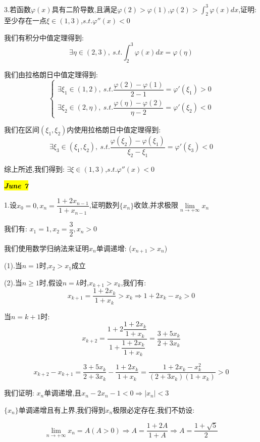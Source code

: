 3.若函数$\varphi(x)$具有二阶导数,且满足$\varphi(2)>\varphi(1)$,$\varphi(2)>\int_{2}^{3}\varphi(x)dx$,证明: 至少存在一点$\xi\in(1,3)$,$s.t.\varphi ''(x)<0$
\begin{solution}
	
	我们有积分中值定理得到: 
	$$\exists \eta\in(2,3),\ s.t. \int_{2}^{3}\varphi(x)dx=\varphi(\eta)$$
	
	我们由拉格朗日中值定理得到: 
	$$\left\lbrace 
	\begin{array}{l}
		\exists \xi_{1}\in(1,2),\ s.t. \dfrac{\varphi(2)-\varphi(1)}{2-1}=\varphi '(\xi_{1})>0\\
		\exists \xi_{2}\in(2,\eta),\ s.t. \dfrac{\varphi(\eta)-\varphi(2)}{\eta-2}=\varphi '(\xi_{2})<0
	\end{array}
	\right. $$
	
	我们在区间$(\xi_{1},\xi_{2})$内使用拉格朗日中值定理得到: 
	$$\exists \xi_{3}\in(\xi_{1},\xi_{2}),\ s.t. \dfrac{\varphi(\xi_{2})-\varphi(\xi_{1})}{\xi_{2}-\xi_{1}}=\varphi '(\xi_{3})<0$$
	
	综上所述,我们得到: $\exists \xi\in(1,3)$,$s.t.\varphi ''(x)<0$
\end{solution}


\hl{\textbf{\textit{June 7}}}

1.设$x_{0}=0,x_{n}=\dfrac{1+2x_{n-1}}{1+x_{n-1}}$,证明数列$\{x_{n}\}$收敛,并求极限$\lim\limits_{n\rightarrow +\infty}x_{n}$
\begin{solution}
	
	我们有: $x_{1}=1,x_{2}=\dfrac{3}{2},x_{n}>0$
	
	我们使用数学归纳法来证明$x_{n}$单调递增: ($x_{n+1}>x_{n}$)
	
	(1).当$n=1$时,$x_{2}>x_{1}$成立
	
	(2).当$n\geq 1$时,假设$n=k$时,$x_{k+1}>x_{k}$,我们有: 
	$$x_{k+1}=\dfrac{1+2x_{k}}{1+x_{k}}>x_{k}\Rightarrow 1+2x_{k}-x_{k}>0$$
	
	当$n=k+1$时: 
	$$x_{k+2}=\dfrac{1+2\dfrac{1+2x_{k}}{1+x_{k}}}{1+\dfrac{1+2x_{k}}{1+x_{k}}}=\dfrac{3+5x_{k}}{2+3x_{k}}$$
	
	$$x_{k+2}-x_{k+1}=\dfrac{3+5x_{k}}{2+3x_{k}}-\dfrac{1+2x_{k}}{1+x_{k}}=\dfrac{1+2x_{k}-x_{k}^2}{(2+3x_{k})(1+x_{k})}>0$$
	
	我们证明: $x_{n}$单调递增,且$x_{n}-2x_{n}-1<0\Rightarrow |x_{n}|<3$
	
	$\{x_{n}\}$单调递增且有上界,我们得到$x_{n}$极限必定存在,我们不妨设: 
	
	$$\lim\limits_{n\rightarrow +\infty}x_{n}=A(A>0)\Rightarrow A=\frac{1+2A}{1+A}\Rightarrow A=\dfrac{1+\sqrt{5}}{2}$$
\end{solution}

